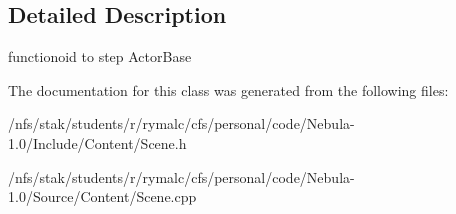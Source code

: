 \subsection{Detailed Description}
functionoid to step ActorBase 

The documentation for this class was generated from the following files:\begin{DoxyCompactItemize}
\item 
/nfs/stak/students/r/rymalc/cfs/personal/code/Nebula-\/1.0/Include/Content/Scene.h\item 
/nfs/stak/students/r/rymalc/cfs/personal/code/Nebula-\/1.0/Source/Content/Scene.cpp\end{DoxyCompactItemize}
